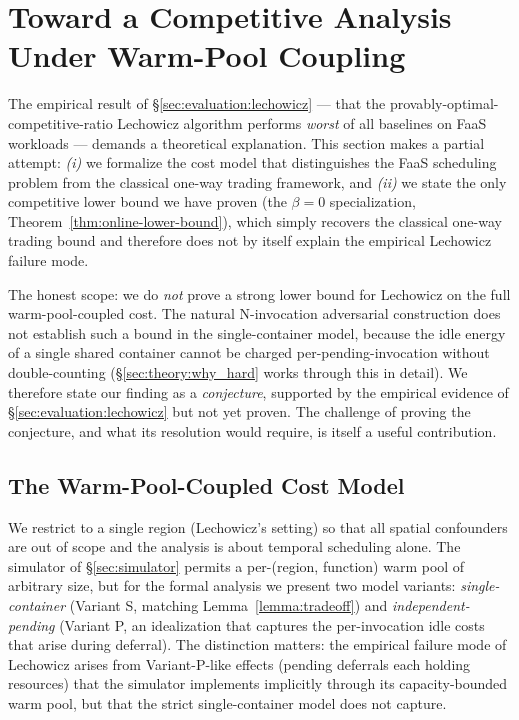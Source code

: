 \section{Toward a Competitive Analysis Under Warm-Pool Coupling}
\label{sec:theory}

The empirical result of \S\ref{sec:evaluation:lechowicz} ---
that the provably-optimal-competitive-ratio Lechowicz algorithm
performs \emph{worst} of all baselines on FaaS workloads --- demands
a theoretical explanation. This section makes a partial attempt:
\emph{(i)} we formalize the cost model that distinguishes the FaaS
scheduling problem from the classical one-way trading framework, and
\emph{(ii)} we state the only competitive lower bound we have proven
(the $\beta=0$ specialization, Theorem~\ref{thm:online-lower-bound}),
which simply recovers the classical one-way trading bound and
therefore does not by itself explain the empirical Lechowicz failure
mode.

The honest scope: we do \emph{not} prove a strong lower bound for
Lechowicz on the full warm-pool-coupled cost. The natural
N-invocation adversarial construction does not establish such a bound
in the single-container model, because the idle energy of a single
shared container cannot be charged per-pending-invocation without
double-counting (\S\ref{sec:theory:why_hard} works through this in
detail). We therefore state our finding as a \emph{conjecture},
supported by the empirical evidence of
\S\ref{sec:evaluation:lechowicz} but not yet proven. The challenge of
proving the conjecture, and what its resolution would require, is
itself a useful contribution.

\subsection{The Warm-Pool-Coupled Cost Model}
\label{sec:theory:model}

We restrict to a single region (Lechowicz's setting) so that all
spatial confounders are out of scope and the analysis is about
temporal scheduling alone. The simulator of \S\ref{sec:simulator}
permits a per-(region, function) warm pool of arbitrary size, but
for the formal analysis we present two model variants:
\emph{single-container} (Variant S, matching Lemma~\ref{lemma:tradeoff})
and \emph{independent-pending} (Variant P, an idealization that captures
the per-invocation idle costs that arise during deferral). The
distinction matters: the empirical failure mode of Lechowicz arises
from Variant-P-like effects (pending deferrals each holding resources)
that the simulator implements implicitly through its capacity-bounded
warm pool, but that the strict single-container model does not
capture.

